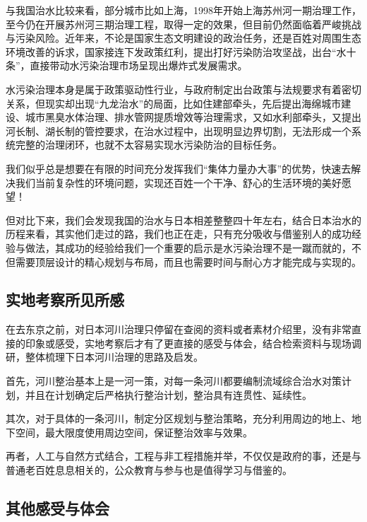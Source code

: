 \documentclass[
]{book}
\begin{document}
与我国治水比较来看，部分城市比如上海，1998年开始上海苏州河一期治理工作，至今仍在开展苏州河三期治理工程，取得一定的效果，但目前仍然面临着严峻挑战与污染风险。近年来，不论是国家生态文明建设的政治任务，还是百姓对周围生态环境改善的诉求，国家接连下发政策红利，提出打好污染防治攻坚战，出台``水十条''，直接带动水污染治理市场呈现出爆炸式发展需求。

水污染治理本身是属于政策驱动性行业，与政府制定出台政策与法规要求有着密切关系，但现实却出现``九龙治水''的局面，比如住建部牵头，先后提出海绵城市建设、城市黑臭水体治理、排水管网提质增效等治理需求，又如水利部牵头，又提出河长制、湖长制的管控要求，在治水过程中，出现明显边界切割，无法形成一个系统完整的治理闭环，也就不太容易实现水污染防治的目标任务。

我们似乎总是想要在有限的时间充分发挥我们``集体力量办大事''的优势，快速去解决我们当前复杂性的环境问题，实现还百姓一个干净、舒心的生活环境的美好愿望！

但对比下来，我们会发现我国的治水与日本相差整整四十年左右，结合日本治水的历程来看，其实他们走过的路，我们也正在走，只有充分吸收与借鉴别人的成功经验与做法，其成功的经验给我们一个重要的启示是水污染治理不是一蹴而就的，不但需要顶层设计的精心规划与布局，而且也需要时间与耐心方才能完成与实现的。

\hypertarget{ux5b9eux5730ux8003ux5bdfux6240ux89c1ux6240ux611f}{%
\subsection{实地考察所见所感}\label{ux5b9eux5730ux8003ux5bdfux6240ux89c1ux6240ux611f}}

在去东京之前，对日本河川治理只停留在查阅的资料或者素材介绍里，没有非常直接的印象或感受，实地考察后才有了更直接的感受与体会，结合检索资料与现场调研，整体梳理下日本河川治理的思路及启发。

首先，河川整治基本上是一河一策，对每一条河川都要编制流域综合治水对策计划，并且在计划确定后严格执行整治计划，整治具有连贯性、延续性。

其次，对于具体的一条河川，制定分区规划与整治策略，充分利用周边的地上、地下空间，最大限度使用周边空间，保证整治效率与效果。

再者，人工与自然方式结合，工程与非工程措施并举，不仅仅是政府的事，还是与普通老百姓息息相关的，公众教育与参与也是值得学习与借鉴的。

\hypertarget{ux5176ux4ed6ux611fux53d7ux4e0eux4f53ux4f1a}{%
\subsection{其他感受与体会}\label{ux5176ux4ed6ux611fux53d7ux4e0eux4f53ux4f1a}}
\end{document}

